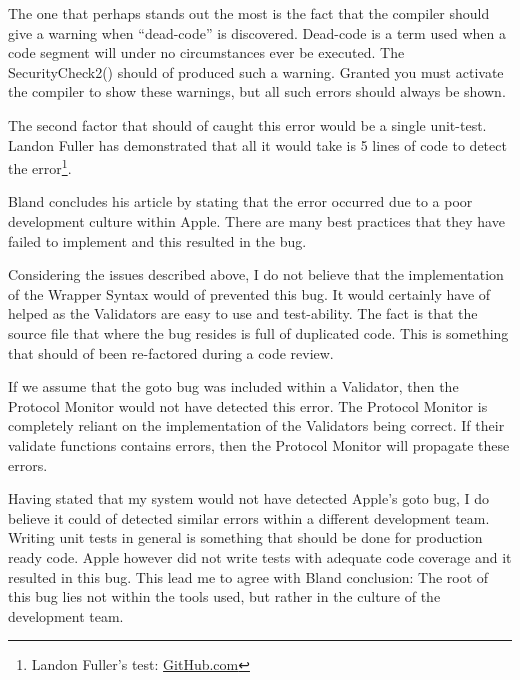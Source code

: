 The one that perhaps stands out the most is the fact that the compiler should give a warning when ``dead-code'' is discovered. Dead-code is a term used when a code segment will under no circumstances ever be executed. The SecurityCheck2() should of produced such a warning. Granted you must activate the compiler to show these warnings, but all such errors should always be shown.

The second factor that should of caught this error would be a single unit-test. Landon Fuller has demonstrated that all it would take is 5 lines of code to detect the error\footnote{Landon Fuller's test: \href{https://github.com/landonf/Testability-CVE-2014-1266}{GitHub.com}}.

Bland concludes his article by stating that the error occurred due to a poor development culture within Apple. There are many best practices that they have failed to implement and this resulted in the bug.

Considering the issues described above, I do not believe that the implementation of the Wrapper Syntax would of prevented this bug. It would certainly have of helped as the Validators are easy to use and test-ability. The fact is that the source file that where the bug resides is full of duplicated code. This is something that should of been re-factored during a code review. 

If we assume that the goto bug was included within a Validator, then the Protocol Monitor would not have detected this error. The Protocol Monitor is completely reliant on the implementation of the Validators being correct. If their validate functions contains errors, then the Protocol Monitor will propagate these errors.


Having stated that my system would not have detected Apple's goto bug, I do believe it could of detected similar errors within a different development team. Writing unit tests in general is something that should be done for production ready code. Apple however did not write tests with adequate code coverage and it resulted in this bug. This lead me to agree with Bland conclusion: The root of this bug lies not within the tools used, but rather in the culture of the development team.

\iffalse
